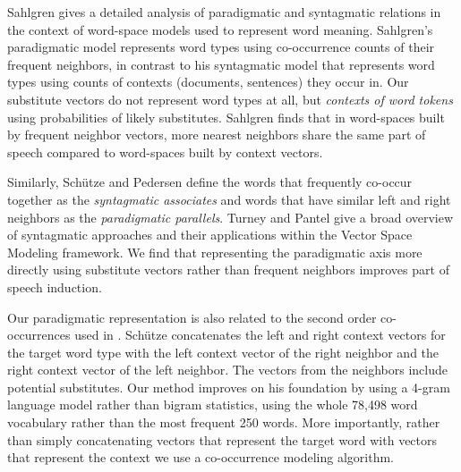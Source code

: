 Sahlgren  gives a detailed analysis of
paradigmatic and syntagmatic relations in the context of word-space
models used to represent word meaning.  Sahlgren's paradigmatic model
represents word types using co-occurrence counts of their frequent
neighbors, in contrast to his syntagmatic model that represents word
types using counts of contexts (documents, sentences) they occur in.
Our substitute vectors do not represent word types at all, but {\em
  contexts of word tokens} using probabilities of likely substitutes.
Sahlgren finds that in word-spaces built by frequent neighbor vectors,
more nearest neighbors share the same part of speech compared to
word-spaces built by context vectors.  

Similarly, Sch{\"u}tze and Pedersen  define the
words that frequently co-occur together as the {\em syntagmatic
  associates} and words that have similar left and right neighbors as
the {\em paradigmatic parallels}.  Turney and Pantel
 give a broad overview of
syntagmatic approaches and their applications within the Vector Space
Modeling framework.  We find that representing the paradigmatic axis
more directly using substitute vectors rather than frequent neighbors
improves part of speech induction.

Our paradigmatic representation is also related to the second order
co-occurrences used in \cite{Schutze:1995:DPT:976973.976994}.
Sch{\"u}tze concatenates the left and right context vectors for the
target word type with the left context vector of the right neighbor
and the right context vector of the left neighbor.  The vectors from
the neighbors include potential substitutes.  Our method improves on
his foundation by using a 4-gram language model rather than bigram
statistics, using the whole 78,498 word vocabulary rather than the
most frequent 250 words.  More importantly, rather than simply
concatenating vectors that represent the target word with vectors that
represent the context we use a co-occurrence modeling algorithm.


